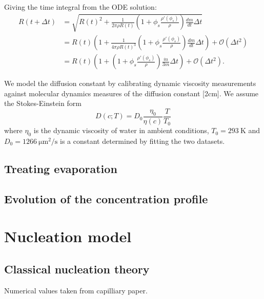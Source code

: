 \documentclass[12pt]{report}
\begin{document}
Giving the time integral from the ODE solution:
\begin{equation}
  \begin{aligned}
    R(t + \Delta t)
    &= \sqrt{R(t)^2 + \frac{1}{2\pi \rho R(t)}
      \left(
      1 + \phi_s \frac{\rho'(\phi_s)}{\rho}
      \right)
      \frac{dm}{dt} \Delta t} \\
    &= R(t) \left(
    1 + \frac{1}{4\pi \rho R(t)^3}
    \left(
    1 + \phi_s \frac{\rho'(\phi_s)}{\rho}
    \right)
    \frac{dm}{dt} \Delta t
    \right)
    + \mathcal{O}(\Delta t^2) \\
    &= R(t) \left(
    1 +
    \left(
    1 + \phi_s \frac{\rho'(\phi_s)}{\rho}
    \right)
    \frac{\dot{m}}{3m} \Delta t
    \right)
    + \mathcal{O}(\Delta t^2).
  \end{aligned}
\end{equation}

We model the diffusion constant by calibrating dynamic viscosity measurements
 against molecular dynamics measures of the diffusion constant [2cm].
We assume the Stokes-Einstein form
\begin{equation}
  D(c;T) = D_0 \frac{\eta_0}{\eta(c)} \frac{T}{T_0}
\end{equation}
where $\eta_0$ is the dynamic viscosity of water in ambient conditions, $T_0 = \SI{293}{\kelvin}$ and $D_0 = \SI{1266}{\micro\metre^2\per\second}$ is a constant determined by fitting the two datasets.

\subsection{Treating evaporation}
\subsection{Evolution of the concentration profile}

\section{Nucleation model}
\subsection{Classical nucleation theory}

Numerical values taken from capilliary paper.
\end{document}
